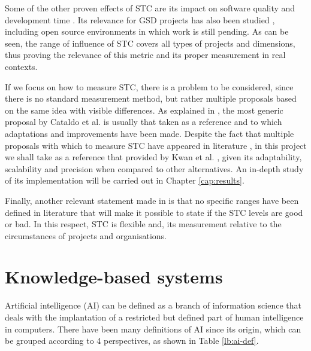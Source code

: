 Some of the other proven effects of STC are its impact on software quality \cite{cataldo_identification_2006, cataldo_socio-technical_2008, kwan_does_2011, cataldo_coordination_2013, smite_socio-technical_2012, ehrlich_analysis_2008, marczak_investigating_2009} and development time \cite{cataldo_identification_2006, cataldo_socio-technical_2008, kwan_does_2011}. Its relevance for GSD projects has also been studied \cite{cataldo_identification_2006, cataldo_socio-technical_2008, cataldo_coordination_2013, ehrlich_analysis_2008}, including open source environments \cite{wagstrom_communication_2010, syeed_socio-technical_2015, syeed_socio-technical_2014, syeed_socio-technical_2014-1, bolici_coordination_2009} in which work is still pending. As can be seen, the range of influence of STC covers all types of projects and dimensions, thus proving the relevance of this metric and its proper measurement in real contexts.

If we focus on how to measure STC, there is a problem to be considered, since there is no standard measurement method, but rather multiple proposals based on the same idea with visible differences. As explained in \cite{sierra_systematic_2018}, the most generic proposal by Cataldo et al. \cite{cataldo_identification_2006, cataldo_socio-technical_2008} is usually that taken as a reference and to which adaptations and improvements have been made. Despite the fact that multiple proposals with which to measure STC have appeared in literature \cite{cataldo_identification_2006, cataldo_socio-technical_2008, wagstrom_communication_2010, valetto_using_2007, portillo_2014, li_analysis_2012}, in this project we shall take as a reference that provided by Kwan et al. \cite{kwan_weighted_2009, kwan_does_2011}, given its adaptability, scalability and precision when compared to other alternatives. An in-depth study of its implementation will be carried out in Chapter \ref{cap:results}.

Finally, another relevant statement made in \cite{sierra_systematic_2018} is that no specific ranges have been defined in literature that will make it possible to state if the STC levels are good or bad. In this respect, STC is flexible and, its measurement relative to the circumstances of projects and organisations.

\section{Knowledge-based systems}

Artificial intelligence (AI) can be defined as a branch of information science that deals with the implantation of a restricted but defined part of human intelligence \cite{popovic_methods_1994} in computers. There have been many definitions of AI since its origin, which can be grouped according to 4 perspectives, as shown in Table \ref{lb:ai-def}.

